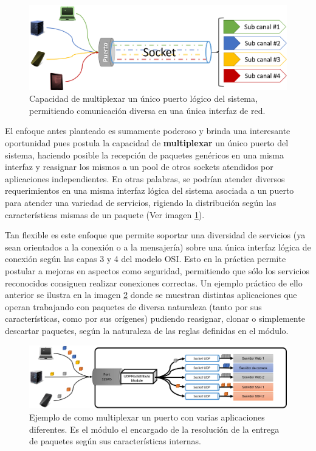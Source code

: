 \begin{figure}[!h]
	\centering
	\includegraphics[scale=.5]{imagenes/socketMultiplexed.png}
	\caption{Capacidad de multiplexar un único puerto lógico del sistema, permitiendo comunicación diversa en una única interfaz de red.}
	\label{fig:multiplexarPuerto}
\end{figure}

El enfoque antes planteado es sumamente poderoso y brinda una interesante oportunidad pues postula la capacidad de \textbf{multiplexar} un único puerto del sistema, haciendo posible la recepción de paquetes genéricos en una misma interfaz y reasignar los mismos a un pool de otros sockets atendidos por aplicaciones independientes. En otras palabras, se podrían atender diversos requerimientos en una misma interfaz lógica del sistema asociada a un puerto para atender una variedad de servicios, rigiendo la distribución según las características mismas de un paquete (Ver imagen \ref{fig:multiplexarPuerto}).

Tan flexible es este enfoque que permite soportar una diversidad de servicios (ya sean orientados a la conexión o a la mensajería) sobre una única interfaz lógica de conexión según las capas 3 y 4 del modelo OSI. Esto en la práctica permite postular a mejoras en aspectos como seguridad, permitiendo que sólo los servicios reconocidos consiguen realizar conexiones correctas. Un ejemplo práctico de ello anterior se ilustra en la imagen \ref{fig:multiplexarPuertoEjemplo} donde se muestran distintas aplicaciones que operan trabajando con paquetes de diversa naturaleza (tanto por sus características, como por sus orígenes) pudiendo reasignar, clonar o simplemente descartar paquetes, según la naturaleza de las reglas definidas en el módulo.

\begin{figure}[!h]
	\centering
	\includegraphics[scale=.6]{imagenes/udpredistributeapplications.png}
	\caption{Ejemplo de como multiplexar un puerto con varias aplicaciones diferentes. Es el módulo el encargado de la resolución de la entrega de paquetes según sus características internas.}
	\label{fig:multiplexarPuertoEjemplo}
\end{figure}
